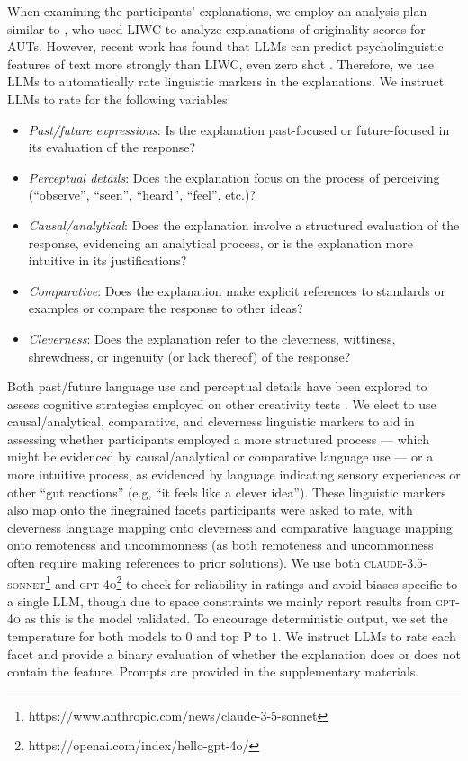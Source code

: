 
When examining the participants' explanations, we employ an analysis plan similar to \citet{orwig2024creative}, who used LIWC to analyze explanations of originality scores for AUTs. However, recent work has found that LLMs can predict psycholinguistic features of text more strongly than LIWC, even zero shot \citep{rathje2024gpt}. Therefore, we use LLMs to automatically rate linguistic markers in the explanations. We instruct LLMs to rate for the following variables: 

\begin{itemize}
    \item \textit{Past/future expressions}: Is the explanation past-focused or future-focused in its evaluation of the response?
    \item \textit{Perceptual details}: Does the explanation focus on the process of perceiving (``observe'', ``seen'', ``heard'', ``feel'', etc.)?
    \item \textit{Causal/analytical}: Does the explanation involve a structured evaluation of the response, evidencing an analytical process, or is the explanation more intuitive in its justifications?
    \item \textit{Comparative}: Does the explanation make explicit references to standards or examples or compare the response to other ideas?
    \item \textit{Cleverness}: Does the explanation refer to the cleverness, wittiness, shrewdness, or ingenuity (or lack thereof) of the response?
\end{itemize}

Both past/future language use and perceptual details have been explored to assess cognitive strategies employed on other creativity tests \citep{orwig2024creative}. We elect to use causal/analytical, comparative, and cleverness linguistic markers to aid in assessing whether participants employed a more structured process --- which might be evidenced by causal/analytical or comparative language use --- or a more intuitive process, as evidenced by language indicating sensory experiences or other ``gut reactions'' (e.g, ``it feels like a clever idea''). These linguistic markers also map onto the finegrained facets participants were asked to rate, with cleverness language mapping onto cleverness and comparative language mapping onto remoteness and uncommonness (as both remoteness and uncommonness often require making references to prior solutions). We use both \textsc{claude-3.5-sonnet}\footnote{https://www.anthropic.com/news/claude-3-5-sonnet} and \textsc{gpt-4o}\footnote{https://openai.com/index/hello-gpt-4o/} to check for reliability in ratings and avoid biases specific to a single LLM, though due to space constraints we mainly report results from \textsc{gpt-4o} as this is the model \citet{rathje2024gpt} validated. To encourage deterministic output, we set the temperature for both models to $0$ and top P to $1$. We instruct LLMs to rate each facet and provide a binary evaluation of whether the explanation does or does not contain the feature. Prompts are provided in the supplementary materials.

